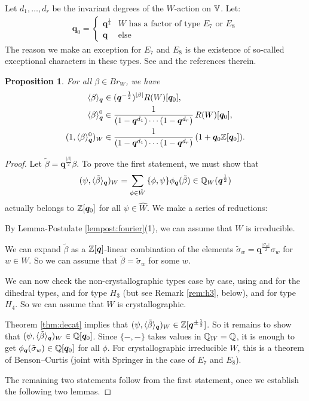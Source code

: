 \documentclass[a4paper,10pt,leqno]{amsart}
\theoremstyle{plain}
\theoremstyle{plain}
\theoremstyle{plain}
\newtheorem{prop}[thm]{Proposition}
\theoremstyle{definition}
\theoremstyle{remark}
\newcommand{\Br}{\mathit{Br}}
\newcommand{\Q}{\bm{q}}
\newcommand{\Tr}[1]{\langle{#1}\rangle_{\Q}}
\begin{document}
Let $d_1, \ldots, d_r$ be the invariant degrees of the $W$-action on $\mathbb{V}$.
Let:
\begin{align}\label{eq:exception}
\Q_0 = 
\left\{\begin{array}{ll}
\Q^{\frac{1}{2}}
	&\text{$W$ has a factor of type $E_7$ or $E_8$}\\
\Q
	&\text{else}
	\end{array}\right.
\end{align}
The reason we make an exception for $E_7$ and $E_8$ is the existence of so-called exceptional characters in these types.
See \cite[\S{9.5}]{gp} and the references therein.

\begin{prop}\label{prop:rationality}
For all $\beta \in \Br_W$, we have
\begin{align}
\Tr{\beta} &\in (\Q^{-\frac{1}{2}})^{|\beta|} R(W)[\Q_0],\\
\Tr{\beta}^0 &\in \frac{1}{(1 - \Q^{d_1}) \cdots (1 - \Q^{d_r})}\, R(W)[\Q_0],\\
(1, \Tr{\beta}^0)_W &\in \frac{1}{(1 - \Q^{d_1}) \cdots (1 - \Q^{d_r})}\, (1 + \Q_0\bb{Z}[\Q_0]).
\end{align}
\end{prop}

\begin{proof}
Let $\tilde{\beta} = \Q^{\frac{|\beta|}{2}} \beta$.
To prove the first statement, we must show that
\begin{align}
(\psi, \Tr{\tilde{\beta}})_W
=	\sum_{\phi \in \hat{W}}
	{\{\phi, \psi\}}
	\phi_{\Q}(\tilde{\beta}) \in \bb{Q}_W(\Q^{\frac{1}{2}})
\end{align}
actually belongs to $\bb{Z}[\Q_0]$ for all $\psi \in \hat{W}$.
We make a series of reductions:

By Lemma-Postulate \ref{lempost:fourier}(1), we can assume that $W$ is irreducible.

We can expand $\tilde{\beta}$ as a $\bb{Z}[\Q]$-linear combination of the elements $\tilde{\sigma}_w = \Q^{\frac{|\sigma_w|}{2}} \sigma_w$ for $w \in W$.
So we can assume that $\tilde{\beta} = \tilde{\sigma}_w$ for some $w$.

We can now check the non-crystallographic types case by case, using \cite[\S{8.3}]{gp} and \cite{lusztig_1994} for the dihedral types, \cite[Table 9.1]{gp} and \cite[\S{7}]{bm_1993} for type $H_3$ (but see Remark \ref{rem:h3}, below), and \cite{al, malle} for type $H_4$.
So we can assume that $W$ is crystallographic.

Theorem \ref{thm:decat} implies that $(\psi, \Tr{\tilde{\beta}})_W \in \bb{Z}[\Q^{\pm \frac{1}{2}}]$.
So it remains to show that $(\psi, \Tr{\tilde{\beta}})_W \in \bb{Q}[\Q_0]$.
Since $\{-, -\}$ takes values in $\mathbb{Q}_W = \mathbb{Q}$, it is enough to get $\phi_{\Q}(\tilde{\sigma}_w) \in \bb{Q}[\Q_0]$ for all $\phi$.
For crystallographic irreducible $W$, this is a theorem of Benson--Curtis \cite{bc} (joint with Springer in the case of $E_7$ and $E_8$).

The remaining two statements follow from the first statement, once we establish the following two lemmas.
\end{proof}
\end{document}
